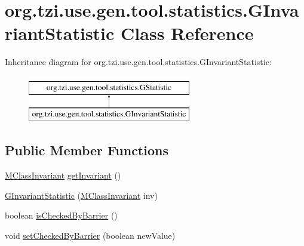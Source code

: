 \hypertarget{classorg_1_1tzi_1_1use_1_1gen_1_1tool_1_1statistics_1_1_g_invariant_statistic}{\section{org.\-tzi.\-use.\-gen.\-tool.\-statistics.\-G\-Invariant\-Statistic Class Reference}
\label{classorg_1_1tzi_1_1use_1_1gen_1_1tool_1_1statistics_1_1_g_invariant_statistic}
}
Inheritance diagram for org.\-tzi.\-use.\-gen.\-tool.\-statistics.\-G\-Invariant\-Statistic\-:\begin{figure}[H]
\begin{center}
\leavevmode
\includegraphics[height=2.000000cm]{classorg_1_1tzi_1_1use_1_1gen_1_1tool_1_1statistics_1_1_g_invariant_statistic}
\end{center}
\end{figure}
\subsection*{Public Member Functions}
\begin{DoxyCompactItemize}
\item 
\hyperlink{classorg_1_1tzi_1_1use_1_1uml_1_1mm_1_1_m_class_invariant}{M\-Class\-Invariant} \hyperlink{classorg_1_1tzi_1_1use_1_1gen_1_1tool_1_1statistics_1_1_g_invariant_statistic_aacd8f1e00a8f11b96d91503da50089d5}{get\-Invariant} ()
\item 
\hyperlink{classorg_1_1tzi_1_1use_1_1gen_1_1tool_1_1statistics_1_1_g_invariant_statistic_aaf2ee1d166c70142afe7e9a3c6c2dd42}{G\-Invariant\-Statistic} (\hyperlink{classorg_1_1tzi_1_1use_1_1uml_1_1mm_1_1_m_class_invariant}{M\-Class\-Invariant} inv)
\item 
boolean \hyperlink{classorg_1_1tzi_1_1use_1_1gen_1_1tool_1_1statistics_1_1_g_invariant_statistic_a6abfb6056be6340769979a01dd416038}{is\-Checked\-By\-Barrier} ()
\item 
void \hyperlink{classorg_1_1tzi_1_1use_1_1gen_1_1tool_1_1statistics_1_1_g_invariant_statistic_aa9f1d69d6cc495a5b4341fa1901ad2d7}{set\-Checked\-By\-Barrier} (boolean new\-Value)
\end{DoxyCompactItemize}
